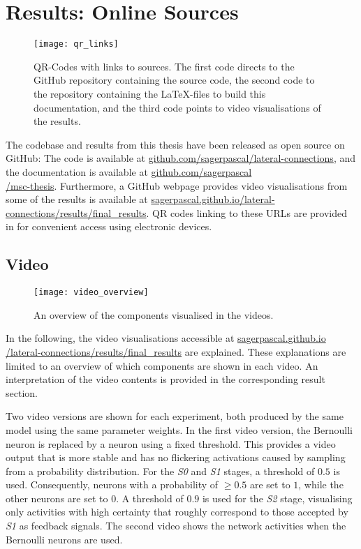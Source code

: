 \chapter{Results: Online Sources}
%
\begin{figure}[h]
    \centering
    \texttt{[image: qr\_links]}
    \caption[QR-Codes with links to sources]{QR-Codes with links to sources. The first code directs to the GitHub repository containing the source code, the second code to the repository containing the \LaTeX-files to build this documentation, and the third code points to video visualisations of the results.}
\end{figure}
%
The codebase and results from this thesis have been released as open source on GitHub: The code is available at \href{https://github.com/sagerpascal/lateral-connections}{github.com/sagerpascal/lateral-connections}, and the documentation is available at \href{https://github.com/sagerpascal/msc-thesis}{github.com/sagerpascal\\/msc-thesis}.
Furthermore, a GitHub webpage provides video visualisations from some of the results is available at \href{https://sagerpascal.github.io/lateral-connections/results/final_results.html}{sagerpascal.github.io/lateral-connections/results/final\_results}.
QR codes linking to these URLs are provided in  for convenient access using electronic devices.


\section{Video}
%
\begin{figure}[h]
    \centering
    \texttt{[image: video\_overview]}
    \caption[Overview of components visualised in the videos]{An overview of the components visualised in the videos.}
\end{figure}
%
In the following, the video visualisations accessible at \href{https://sagerpascal.github.io/lateral-connections/results/final_results.html}{sagerpascal.github.io\\/lateral-connections/results/final\_results} are explained.
These explanations are limited to an overview of which components are shown in each video.
An interpretation of the video contents is provided in the corresponding result section.

Two video versions are shown for each experiment, both produced by the same model using the same parameter weights.
In the first video version, the Bernoulli neuron is replaced by a neuron using a fixed threshold.
This provides a video output that is more stable and has no flickering activations caused by sampling from a probability distribution.
For the \emph{S0} and \emph{S1} stages, a threshold of $0.5$ is used. Consequently, neurons with a probability of $\geq 0.5$ are set to $1$, while the other neurons are set to $0$.
A threshold of $0.9$ is used for the \emph{S2} stage, visualising only activities with high certainty that roughly correspond to those accepted by \emph{S1} as feedback signals.
The second video shows the network activities when the Bernoulli neurons are used.

